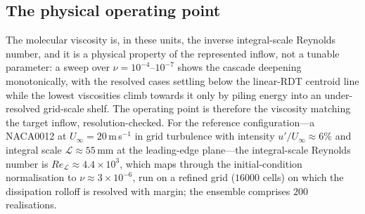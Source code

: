 \documentclass[lineno]{JFM-FLM_Au}
\begin{document}
\subsection{The physical operating point}\label{sec:spec-op}

The molecular viscosity is, in these units, the inverse integral-scale
Reynolds number, and it is a physical property of the represented
inflow, not a tunable parameter: a sweep over
$\nu=10^{-4}$--$10^{-7}$ shows the cascade deepening monotonically, with
the resolved cases settling below the linear-RDT centroid line while the
lowest viscosities climb towards it only by piling energy into an
under-resolved grid-scale shelf. The operating point is therefore the
viscosity matching the target inflow, resolution-checked. For the
reference configuration---a NACA0012 at $U_\infty=20$\,m\,s$^{-1}$ in
grid turbulence with intensity $u'/U_\infty\approx6\%$ and integral
scale $\mathcal{L}\approx55$\,mm at the leading-edge plane---the
integral-scale Reynolds number is
$Re_{\mathcal{L}}\approx4.4\times10^3$, which maps through the
initial-condition normalisation to $\nu\approx3\times10^{-6}$, run on a
refined grid ($16000$ cells) on which the dissipation rolloff is
resolved with margin; the ensemble comprises $200$ realisations.
\end{document}
